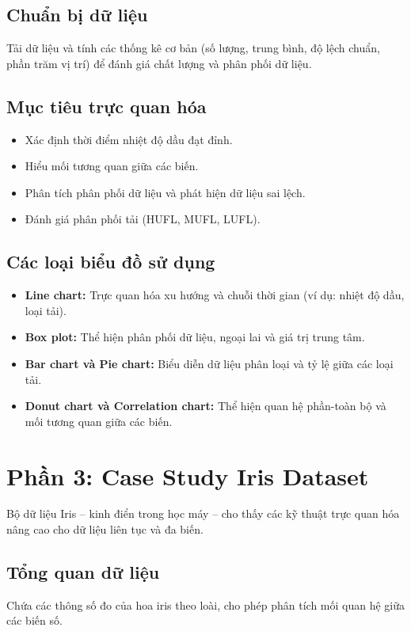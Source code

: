 \documentclass[11pt]{article}
\begin{document}
\subsection{Chuẩn bị dữ liệu}
Tải dữ liệu và tính các thống kê cơ bản (số lượng, trung bình, độ lệch chuẩn, phần trăm vị trí) để đánh giá chất lượng và phân phối dữ liệu.

\subsection{Mục tiêu trực quan hóa}
\begin{itemize}
    \item Xác định thời điểm nhiệt độ dầu đạt đỉnh.
    \item Hiểu mối tương quan giữa các biến.
    \item Phân tích phân phối dữ liệu và phát hiện dữ liệu sai lệch.
    \item Đánh giá phân phối tải (HUFL, MUFL, LUFL).
\end{itemize}

\subsection{Các loại biểu đồ sử dụng}
\begin{itemize}
    \item \textbf{Line chart:} Trực quan hóa xu hướng và chuỗi thời gian (ví dụ: nhiệt độ dầu, loại tải).
    \item \textbf{Box plot:} Thể hiện phân phối dữ liệu, ngoại lai và giá trị trung tâm.
    \item \textbf{Bar chart và Pie chart:} Biểu diễn dữ liệu phân loại và tỷ lệ giữa các loại tải.
    \item \textbf{Donut chart và Correlation chart:} Thể hiện quan hệ phần-toàn bộ và mối tương quan giữa các biến.
\end{itemize}


\section{Phần 3: Case Study Iris Dataset}
Bộ dữ liệu Iris – kinh điển trong học máy – cho thấy các kỹ thuật trực quan hóa nâng cao cho dữ liệu liên tục và đa biến.

\subsection{Tổng quan dữ liệu}
Chứa các thông số đo của hoa iris theo loài, cho phép phân tích mối quan hệ giữa các biến số.
\end{document}
